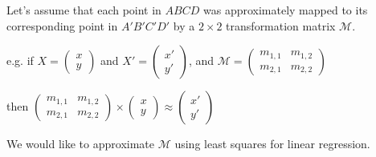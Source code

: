 Let's assume that each point in $ABCD$ was approximately mapped to its corresponding point in $A'B'C'D'$ by a $2\times2$ transformation matrix $\mathcal{M}$.

e.g. if $X = \begin{pmatrix} x \\ y \end{pmatrix}$ and $X' = \begin{pmatrix} x' \\ y' \end{pmatrix}$, and $\mathcal{M} = \begin{pmatrix} m_{1,1} & m_{1,2} \\ m_{2,1} & m_{2,2} \end{pmatrix}$

then $\begin{pmatrix} m_{1,1} & m_{1,2} \\ m_{2,1} & m_{2,2} \end{pmatrix} \times \begin{pmatrix} x \\ y \end{pmatrix} \approx \begin{pmatrix} x' \\ y'  \end{pmatrix}$

We would like to approximate $\mathcal{M}$ using least squares for linear regression.

